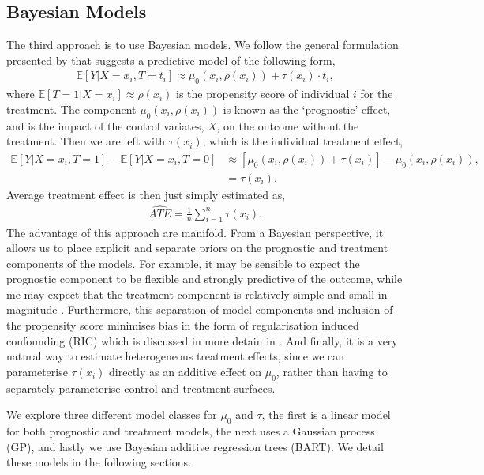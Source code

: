 \documentclass[12pt, a4paper]{article}
\begin{document}
\subsection{Bayesian Models}

The third approach is to use Bayesian models. We follow the general formulation
presented by \cite{hahn2020} that suggests a predictive model of the following
form,
\begin{align}
  \mathbb{E}[Y|X{=}x_i, T{=}t_i] \approx \mu_0(x_i, \rho(x_i)) 
    + \tau(x_i)\cdot t_i, \label{eq:bayesmods}
\end{align}
where $\mathbb{E}[T=1|X{=}x_i] \approx \rho(x_i)$ is the propensity score of
individual $i$ for the treatment. The component $\mu_0(x_i, \rho(x_i))$ is
known as the `prognostic' effect, and is the impact of the control variates,
$X$, on the outcome without the treatment. Then we are left with $\tau(x_i)$,
which is the individual treatment effect,
\begin{align*}
  \mathbb{E}[Y|X{=}x_i, T{=}1] - \mathbb{E}[Y|X{=}x_i, T{=}0] &\approx 
    \left[\mu_0(x_i, \rho(x_i)) + \tau(x_i)\right] - \mu_0(x_i, \rho(x_i)), \\
    &=\tau(x_i).
\end{align*}
Average treatment effect is then just simply estimated as,
\begin{align*}
  \hat{ATE} = \frac{1}{n}\sum^n_{i=1} \tau(x_i).
\end{align*}
The advantage of this approach are manifold. From a Bayesian perspective, it
allows us to place explicit and separate priors on the prognostic and treatment
components of the models. For example, it may be sensible to expect the
prognostic component to be flexible and strongly predictive of the outcome,
while me may expect that the treatment component is relatively simple and small
in magnitude \citep{hahn2020}. Furthermore, this separation of model components
and inclusion of the propensity score minimises bias in the form of
regularisation induced confounding (RIC) which is discussed in more detain in
\citep{hahn2018, hahn2020}. And finally, it is a very natural way to estimate
heterogeneous treatment effects, since we can parameterise $\tau(x_i)$
directly as an additive effect on $\mu_0$, rather than having to separately 
parameterise control and treatment surfaces.

We explore three different model classes for $\mu_0$ and $\tau$, the first is a
linear model for both prognostic and treatment models, the next uses a Gaussian
process (GP), and lastly we use Bayesian additive regression trees (BART). We 
detail these models in the following sections. 
\end{document}
